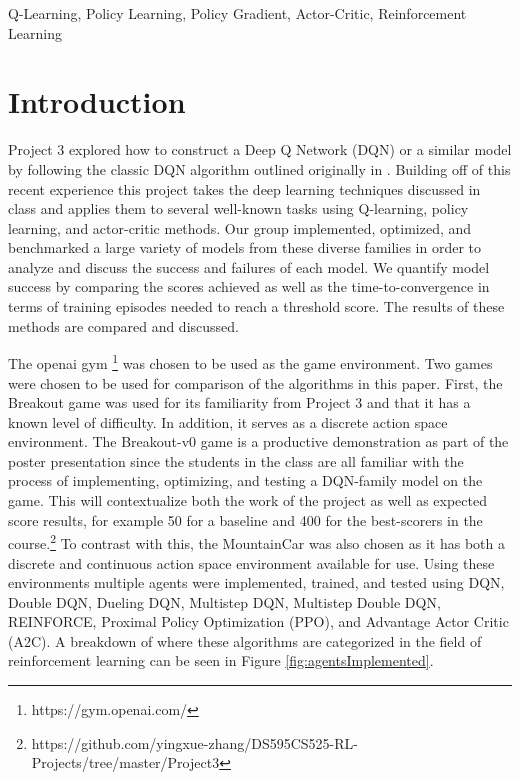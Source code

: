 \documentclass[conference]{IEEEtran}
\begin{document}
\begin{IEEEkeywords}
Q-Learning, Policy Learning, Policy Gradient, Actor-Critic, Reinforcement Learning
\end{IEEEkeywords}

\section{Introduction}
Project 3 explored how to construct a Deep Q Network (DQN) or a similar model by following the classic DQN algorithm outlined originally in \cite{DQNOriginalPaper}.
Building off of this recent experience this project takes the deep learning techniques discussed in class and applies them to several well-known tasks using Q-learning, policy learning, and actor-critic methods. Our group implemented, optimized, and benchmarked a large variety of models from these diverse families in order to analyze and discuss the success and failures of each model. We quantify model success by comparing the scores achieved as well as the time-to-convergence in terms of training episodes needed to reach a threshold score.
The results of these methods are compared and discussed.

The openai gym \footnote{https://gym.openai.com/} was chosen to be used as the game environment.
Two games were chosen to be used for comparison of the algorithms in this paper.
First, the Breakout game was used for its familiarity from Project 3 and that it has a known level of difficulty.
In addition, it serves as a discrete action space environment. The Breakout-v0 game is a productive demonstration as part of the poster presentation since the students in the class are all familiar with the process of implementing, optimizing, and testing a DQN-family model on the game. This will contextualize both the work of the project as well as expected score results, for example 50 for a baseline and 400 for the best-scorers in the course.\footnote{https://github.com/yingxue-zhang/DS595CS525-RL-Projects/tree/master/Project3}
To contrast with this, the MountainCar was also chosen as it has both a discrete and continuous action space environment available for use.
Using these environments multiple agents were implemented, trained, and tested using DQN, Double DQN, Dueling DQN, Multistep DQN, Multistep Double DQN, REINFORCE, Proximal Policy Optimization (PPO), and Advantage Actor Critic (A2C).
A breakdown of where these algorithms are categorized in the field of reinforcement learning can be seen in Figure \ref{fig:agentsImplemented}.
\end{document}
